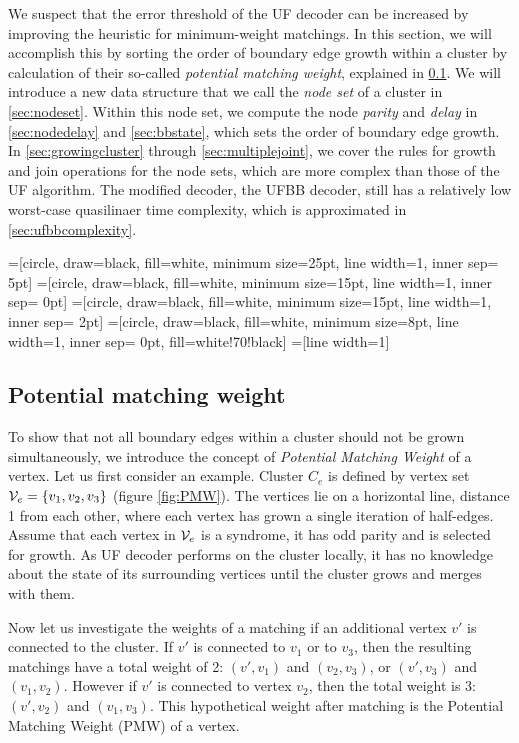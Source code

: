 We suspect that the error threshold of the UF decoder can be increased by improving the heuristic for minimum-weight matchings. In this section, we will accomplish this by sorting the order of boundary edge growth within a cluster by calculation of their so-called \emph{potential matching weight}, explained in \ref{sec:PMW}. We will introduce a new data structure that we call the \emph{node set} of a cluster in \ref{sec:nodeset}. Within this node set, we compute the node \emph{parity} and \emph{delay} in \ref{sec:nodedelay} and \ref{sec:bbstate}, which sets the order of boundary edge growth. In \ref{sec:growingcluster} through \ref{sec:multiplejoint}, we cover the rules for growth and join operations for the node sets, which are more complex than those of the UF algorithm. The modified decoder, the UFBB decoder, still has a relatively low worst-case quasilinaer time complexity, which is approximated in \ref{sec:ufbbcomplexity}.


=[circle, draw=black, fill=white, minimum size=25pt, line width=1, inner sep= 5pt]
=[circle, draw=black, fill=white, minimum size=15pt, line width=1, inner sep= 0pt]
=[circle, draw=black, fill=white, minimum size=15pt, line width=1, inner sep= 2pt]
=[circle, draw=black, fill=white, minimum size=8pt, line width=1, inner sep= 0pt, fill=white!70!black]
=[line width=1]
\tikzfading[name=fade right, left color=transparent!0, right color=transparent!100]


\subsection{Potential matching weight}\label{sec:PMW}

To show that not all boundary edges within a cluster should not be grown simultaneously, we introduce the concept of \emph{Potential Matching Weight} of a vertex. Let us first consider an example. Cluster $C_e$ is defined by vertex set $\mathcal{V}_e = \{v_1, v_2, v_3\}$ (figure \ref{fig:PMW}). The vertices lie on a horizontal line, distance 1 from each other, where each vertex has grown a single iteration of half-edges. Assume that each vertex in $\mathcal{V}_e$ is a syndrome, it has odd parity and is selected for growth. As UF decoder performs on the cluster locally, it has no knowledge about the state of its surrounding vertices until the cluster grows and merges with them. 

Now let us investigate the weights of a matching if an additional vertex $v'$ is connected to the cluster.
If $v'$ is connected to $v_1$ or to $v_3$, then the resulting matchings have a total weight of 2: $(v',v_1)$ and $(v_2,v_3)$, or $(v',v_3)$ and $(v_1,v_2)$. However if $v'$ is connected to vertex $v_2$, then the total weight is 3: $(v', v_2)$ and $(v_1, v_3)$. This hypothetical weight after matching is the Potential Matching Weight (PMW) of a vertex.

